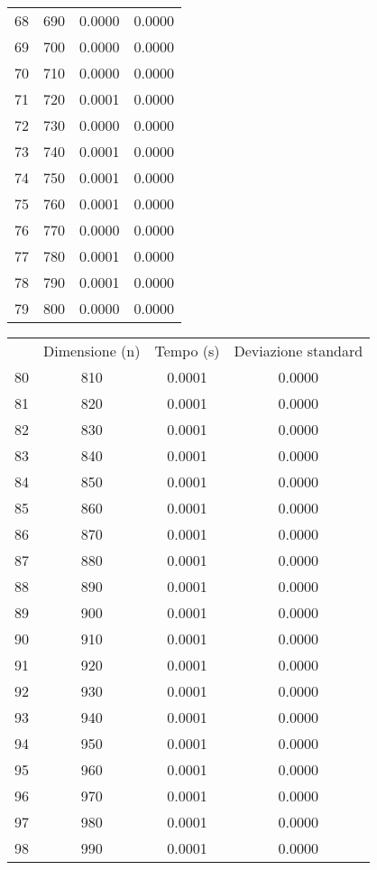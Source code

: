 \begin{table}
\begin{adjustbox}{width=1\textwidth/2}
\begin{tabular}{|c|c|c|c|}
68 & 690 & 0.0000 & 0.0000 \\
\cline{1-4}
69 & 700 & 0.0000 & 0.0000 \\
\cline{1-4}
70 & 710 & 0.0000 & 0.0000 \\
\cline{1-4}
71 & 720 & 0.0001 & 0.0000 \\
\cline{1-4}
72 & 730 & 0.0000 & 0.0000 \\
\cline{1-4}
73 & 740 & 0.0001 & 0.0000 \\
\cline{1-4}
74 & 750 & 0.0001 & 0.0000 \\
\cline{1-4}
75 & 760 & 0.0001 & 0.0000 \\
\cline{1-4}
76 & 770 & 0.0000 & 0.0000 \\
\cline{1-4}
77 & 780 & 0.0001 & 0.0000 \\
\cline{1-4}
78 & 790 & 0.0001 & 0.0000 \\
\cline{1-4}
79 & 800 & 0.0000 & 0.0000 \\
\cline{1-4}
\end{tabular}
\end{adjustbox}
\end{table}

\begin{table}
\centering
\begin{adjustbox}{width=1\textwidth/2}
\begin{tabular}{|c|c|c|c|}
\hline
 & Dimensione (n) & Tempo (s) & Deviazione standard \\
80 & 810 & 0.0001 & 0.0000 \\
\cline{1-4}
81 & 820 & 0.0001 & 0.0000 \\
\cline{1-4}
82 & 830 & 0.0001 & 0.0000 \\
\cline{1-4}
83 & 840 & 0.0001 & 0.0000 \\
\cline{1-4}
84 & 850 & 0.0001 & 0.0000 \\
\cline{1-4}
85 & 860 & 0.0001 & 0.0000 \\
\cline{1-4}
86 & 870 & 0.0001 & 0.0000 \\
\cline{1-4}
87 & 880 & 0.0001 & 0.0000 \\
\cline{1-4}
88 & 890 & 0.0001 & 0.0000 \\
\cline{1-4}
89 & 900 & 0.0001 & 0.0000 \\
\cline{1-4}
90 & 910 & 0.0001 & 0.0000 \\
\cline{1-4}
91 & 920 & 0.0001 & 0.0000 \\
\cline{1-4}
92 & 930 & 0.0001 & 0.0000 \\
\cline{1-4}
93 & 940 & 0.0001 & 0.0000 \\
\cline{1-4}
94 & 950 & 0.0001 & 0.0000 \\
\cline{1-4}
95 & 960 & 0.0001 & 0.0000 \\
\cline{1-4}
96 & 970 & 0.0001 & 0.0000 \\
\cline{1-4}
97 & 980 & 0.0001 & 0.0000 \\
\cline{1-4}
98 & 990 & 0.0001 & 0.0000 \\
\cline{1-4}
\end{tabular}
\end{adjustbox}
\end{table}
